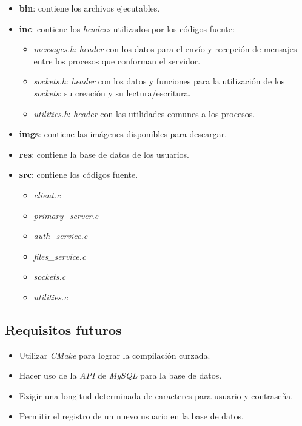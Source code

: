 \documentclass[12pt,a4paper]{article}
\begin{document}
\begin{itemize}[leftmargin=1.5cm]
  \item \textbf{bin}: contiene los archivos ejecutables.
  \item \textbf{inc}: contiene los \emph{headers} utilizados por los
  códigos fuente:

  \begin{itemize}[leftmargin=1cm, nosep]
    \item \emph{messages.h}: \emph{header} con los datos para el
    envío y recepción de mensajes entre los procesos que conforman
    el servidor.
    \item \emph{sockets.h}: \emph{header} con los datos y funciones
    para la utilización de los \emph{sockets}: su creación y su
    lectura/escritura.
    \item \emph{utilities.h}: \emph{header} con las utilidades comunes a los
    procesos.
  \end{itemize}

  \item \textbf{imgs}: contiene las imágenes disponibles para descargar.
  \item \textbf{res}: contiene la base de datos de los usuarios.
  \item \textbf{src}: contiene los códigos fuente.

  \begin{itemize}[leftmargin=1cm, nosep]
    \item \emph{client.c}
    \item \emph{primary\_server.c}
    \item \emph{auth\_service.c}
    \item \emph{files\_service.c}
    \item \emph{sockets.c}
    \item \emph{utilities.c}
  \end{itemize}

\end{itemize}

\subsection{Requisitos futuros}
\label{futurereq}

\begin{itemize}[leftmargin=1.5cm]
  \item Utilizar \emph{CMake} para lograr la compilación curzada.
  \item Hacer uso de la \emph{API} de \emph{MySQL} para la base de datos.
  \item Exigir una longitud determinada de caracteres para usuario y contraseña.
  \item Permitir el registro de un nuevo usuario en la base de datos.
\end{itemize}
\end{document}
